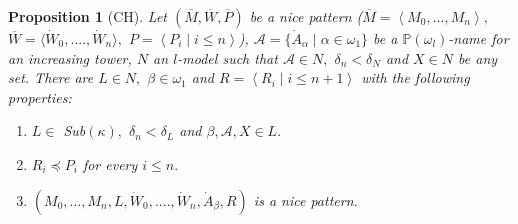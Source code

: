 \documentclass{article}%
\newtheorem{proposition}[theorem]{Proposition}
\begin{document}
\begin{proposition}
[\textsf{CH}]Let $\left(  \overline{M},\overline{W},\overline{P}\right)  $ be
a nice pattern ($\overline{M}=\left\langle M_{0},...,M_{n}\right\rangle ,$
$\overline{W}=\langle\dot{W}_{0},....,\dot{W}_{n}\rangle,$ $P=\left\langle
P_{i}\mid i\leq n\right\rangle $), $\mathcal{A}=\{\dot{A}_{\alpha}\mid
\alpha\in\omega_{1}\}$ be a $\mathbb{P}\left(  \omega_{l}\right)  $-name for
an increasing tower, $N$ an $l$-model such that $\mathcal{A}\in N,$
$\delta_{n}<\delta_{N}$ and $X\in N$ be any set. There are $L\in N,$ $\beta
\in\omega_{1}$ and $R=\left\langle R_{i}\mid i\leq n+1\right\rangle $ with the
following properties: \label{extender nice pattern}

\begin{enumerate}
\item $L\in$ \textsf{Sub}$\left(  \kappa\right)  ,$ $\delta_{n}<\delta_{L}$
and $\beta,\mathcal{A},X\in L.$

\item $R_{i}\preceq P_{i}$ for every $i\leq n.$

\item $(M_{0},...,M_{n},L,\dot{W}_{0},....,\dot{W}_{n},\dot{A}_{\beta},R)$ is
a nice pattern.
\end{enumerate}
\end{proposition}
\end{document}
